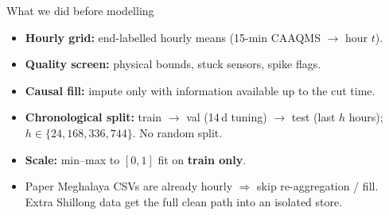 \begin{frame}{What we did before modelling}
  \begin{itemize}
    \item \textbf{Hourly grid:} end-labelled hourly means (15-min CAAQMS $\to$ hour $t$).
    \item \textbf{Quality screen:} physical bounds, stuck sensors, spike flags.
    \item \textbf{Causal fill:} impute only with information available up to the cut time.
    \item \textbf{Chronological split:} train $\to$ val (14\,d tuning) $\to$ test (last $h$ hours);\\
          $h\in\{24,168,336,744\}$. No random split.
    \item \textbf{Scale:} min--max to $[0,1]$ fit on \textbf{train only}.
    \item Paper Meghalaya CSVs are already hourly $\Rightarrow$ skip re-aggregation / fill.\\
          Extra Shillong data get the full clean path into an isolated store.
  \end{itemize}
\end{frame}
